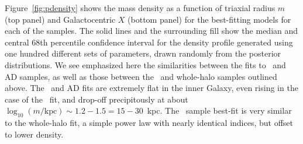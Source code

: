 Figure~\ref{fig:pdensity} shows the mass density as a function of triaxial radius $m$ (top panel) and Galactocentric $X$ (bottom panel) for the best-fitting models for each of the samples. The solid lines and the surrounding fill show the median and central 68th percentile confidence interval for the density profile generated using one hundred different sets of parameters, drawn randomly from the posterior distributions. We see emphasized here the similarities between the fits to \eLz\ and AD samples, as well as those between the \JRLz\ and whole-halo samples outlined above. The \eLz\ and AD fits are extremely flat in the inner Galaxy, even rising in the case of the \eLz\ fit, and drop-off precipitously at about $\log_{10}(m/\mathrm{kpc}) \sim 1.2-1.5 = 15-30$~kpc. The \JRLz\ sample best-fit is very similar to the whole-halo fit, a simple power law with nearly identical indices, but offset to lower density.

